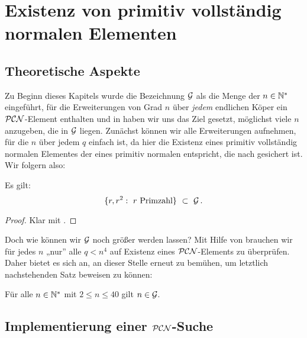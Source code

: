 \section{Existenz von primitiv vollständig normalen Elementen}

\subsection{Theoretische Aspekte}

Zu Beginn dieses Kapitels wurde die Bezeichnung $\mathcal{G}$ als die Menge der
$n\in \mathbb{N}^\ast$ eingeführt, für die Erweiterungen von Grad $n$ über \emph{jedem}
endlichen Köper ein $\mathcal{PCN}$-Element enthalten und in
 haben wir uns das Ziel gesetzt, möglichst viele $n$
anzugeben, die in $\mathcal{G}$ liegen. Zunächst können wir alle Erweiterungen
aufnehmen, für die $n$ über jedem $q$ einfach ist,
da hier die Existenz eines primitiv vollständig normalen Elementes
der eines primitiv normalen entspricht, die nach 
 gesichert ist. Wir folgern also:

\begin{proposition}
  Es gilt:
  \[ \{ r, r^2:\ r \text{ Primzahl}\} \ \subset\  \mathcal{G}\,. \]
\end{proposition}
\begin{proof}
  Klar mit .
\end{proof}

Doch wie können wir $\mathcal{G}$ noch größer werden lassen? 
Mit Hilfe von  brauchen wir für jedes $n$ 
„nur” alle $q < n^4$ auf Existenz eines $\mathcal{PCN}$-Elements zu überprüfen. Daher
bietet es sich an, an dieser Stelle erneut \sage zu bemühen, um letztlich
nachstehenden Satz beweisen zu können:

\begin{satz}
  \label{satz:hauptsatz_g}
  Für alle $n\in \mathbb{N}^\ast$ mit $2 \leq n \leq 40$ gilt
  $n \in \mathcal{G}$.
\end{satz}


\subsection{Implementierung einer $\mathcal{PCN}$-Suche}


